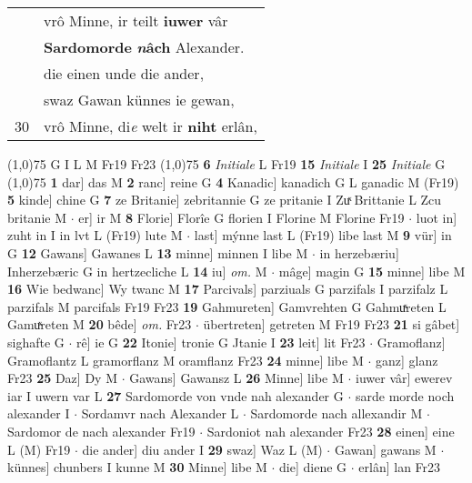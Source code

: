 \documentclass[8pt,a4paper,notitlepage]{article}
\begin{document}
\begin{table}[ht]
\begin{minipage}[t]{0.5\linewidth}
\begin{tabular}{rl}
 & vrô Minne, ir teilt \textbf{iuwer} vâr\\ 
 & \textbf{Sardomorde} \textbf{\textit{n}âch} Alexander.\\ 
 & die einen unde die ander,\\ 
 & swaz Gawan künnes ie gewan,\\ 
30 & vrô Minne, di\textit{e} welt ir \textbf{niht} erlân,\\ 
\end{tabular}
\scriptsize
\line(1,0){75} \newline
G I L M Fr19 Fr23 \newline
\line(1,0){75} \newline
\textbf{6} \textit{Initiale} L Fr19  \textbf{15} \textit{Initiale} I  \textbf{25} \textit{Initiale} G  \newline
\line(1,0){75} \newline
\textbf{1} dar] das M \textbf{2} ranc] reine G \textbf{4} Kanadic] kanadich G L ganadic M (Fr19) \textbf{5} kinde] chine G \textbf{7} ze Britanie] zebritannie G ze pritanie I Zuͯ Brittanie L Zcu britanie M  $\cdot$ er] ir M \textbf{8} Florie] Florîe G florien I Florine M Florine Fr19  $\cdot$ luot in] zuht in I in lvt L (Fr19) lute M  $\cdot$ last] mýnne last L (Fr19) libe last M \textbf{9} vür] in G \textbf{12} Gawans] Gawanes L \textbf{13} minne] minnen I libe M  $\cdot$ in herzebæriu] Inherzebæric G in hertzecliche L \textbf{14} iu] \textit{om.} M  $\cdot$ mâge] magin G \textbf{15} minne] libe M \textbf{16} Wie bedwanc] Wy twanc M \textbf{17} Parcivals] parziuals G parzifals I parzifalz L parzifals M parcifals Fr19 Fr23 \textbf{19} Gahmureten] Gamvrehten G Gahmuͯreten L Gamuͯreten M \textbf{20} bêde] \textit{om.} Fr23  $\cdot$ übertreten] getreten M Fr19 Fr23 \textbf{21} si gâbet] sighafte G  $\cdot$ rê] ie G \textbf{22} Itonie] tronie G Jtanie I \textbf{23} leit] lit Fr23  $\cdot$ Gramoflanz] Gramoflantz L gramorflanz M oramflanz Fr23 \textbf{24} minne] libe M  $\cdot$ ganz] glanz Fr23 \textbf{25} Daz] Dy M  $\cdot$ Gawans] Gawansz L \textbf{26} Minne] libe M  $\cdot$ iuwer vâr] ewerev iar I uwern var L \textbf{27} Sardomorde von vnde nah alexander G  $\cdot$ sarde morde noch alexander I  $\cdot$ Sordamvr nach Alexander L  $\cdot$ Sardomorde nach allexandir M  $\cdot$ Sardomor de nach alexander Fr19  $\cdot$ Sardoniot nah alexander Fr23 \textbf{28} einen] eine L (M) Fr19  $\cdot$ die ander] diu ander I \textbf{29} swaz] Waz L (M)  $\cdot$ Gawan] gawans M  $\cdot$ künnes] chunbers I kunne M \textbf{30} Minne] libe M  $\cdot$ die] diene G  $\cdot$ erlân] lan Fr23 \newline

\end{minipage}
\end{table}
\end{document}

